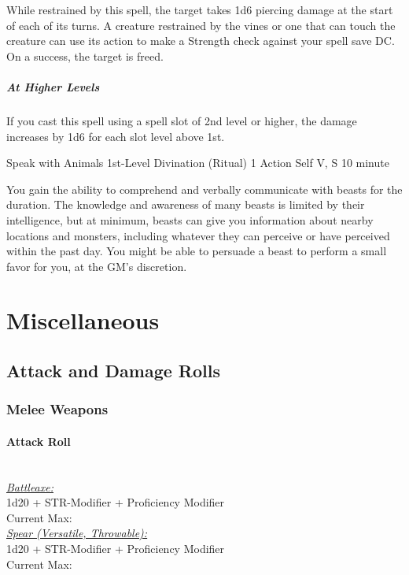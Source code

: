 \documentclass[letterpaper,openany,oneside,twocolumn]{book}
\begin{document}
While restrained by this spell, the target takes 1d6 piercing damage at the start of each of its turns. A creature restrained by the vines or one that can touch the creature can use its action to make a Strength check against your spell save DC. On a success, the target is freed.

\subparagraph*{At Higher Levels} If you cast this spell using a spell slot of 2nd level or higher, the damage increases by 1d6 for each slot level above 1st.

\DndSpellHeader
  {Speak with Animals}
  {1st-Level Divination (Ritual)}
  {1 Action}
  {Self}
  {V, S}
  {10 minute}

You gain the ability to comprehend and verbally communicate with beasts for the duration. The knowledge and awareness of many beasts is limited by their intelligence, but at minimum, beasts can give you information about nearby locations and monsters, including whatever they can perceive or have perceived within the past day. You might be able to persuade a beast to perform a small favor for you, at the GM's discretion.

\vfill\eject

\section*{Miscellaneous}
\subsection*{Attack and Damage Rolls}
\subsubsection*{Melee Weapons}
\paragraph*{Attack Roll}\hfill\\
\underline{\textit{Battleaxe:}}\\
1d20 + STR-Modifier + Proficiency Modifier\\
\indent Current Max: 
\\
\underline{\textit{Spear (Versatile, Throwable):}}\\
1d20 + STR-Modifier + Proficiency Modifier\\
\indent Current Max: 
\end{document}
